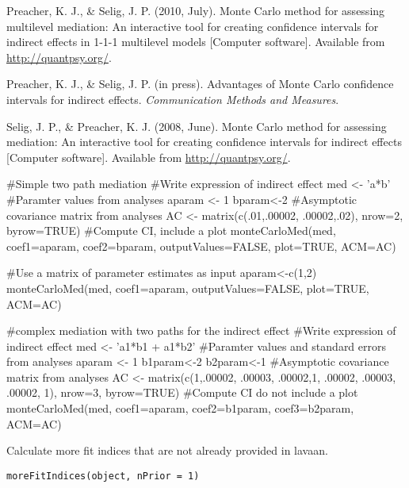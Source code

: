 \documentclass[a4paper]{book}
\begin{document}
%
\begin{References}\relax
Preacher, K. J., \& Selig, J. P. (2010, July). Monte Carlo method for assessing multilevel mediation: An interactive tool for creating confidence intervals for indirect effects in 1-1-1 multilevel models [Computer software]. Available from \url{http://quantpsy.org/}.

Preacher, K. J., \& Selig, J. P. (in press). Advantages of Monte Carlo confidence intervals for indirect effects. \emph{Communication Methods and Measures}.

Selig, J. P., \& Preacher, K. J. (2008, June). Monte Carlo method for assessing mediation: An interactive tool for creating confidence intervals for indirect effects [Computer software]. Available from \url{http://quantpsy.org/}.

\end{References}
%
\begin{Examples}
\begin{ExampleCode}
#Simple two path mediation
#Write expression of indirect effect
med <- 'a*b'
#Paramter values from analyses
aparam <- 1
bparam<-2
#Asymptotic covariance matrix from analyses
AC <- matrix(c(.01,.00002,
               .00002,.02), nrow=2, byrow=TRUE)
#Compute CI, include a plot
monteCarloMed(med, coef1=aparam, coef2=bparam, outputValues=FALSE, plot=TRUE, ACM=AC)

#Use a matrix of parameter estimates as input
aparam<-c(1,2)
monteCarloMed(med, coef1=aparam, outputValues=FALSE, plot=TRUE, ACM=AC)



#complex mediation with two paths for the indirect effect
#Write expression of indirect effect
med <- 'a1*b1 + a1*b2'
#Paramter values and standard errors from analyses
aparam <- 1
b1param<-2
b2param<-1
#Asymptotic covariance matrix from analyses
AC <- matrix(c(1,.00002, .00003,
                    .00002,1, .00002,
					.00003, .00002, 1), nrow=3, byrow=TRUE)
#Compute CI do not include a plot
monteCarloMed(med, coef1=aparam, coef2=b1param, coef3=b2param, ACM=AC)
\end{ExampleCode}
\end{Examples}
%
\begin{Description}\relax
Calculate more fit indices that are not already provided in lavaan.
\end{Description}
%
\begin{Usage}
\begin{verbatim}
moreFitIndices(object, nPrior = 1)
\end{verbatim}
\end{Usage}
\end{document}
